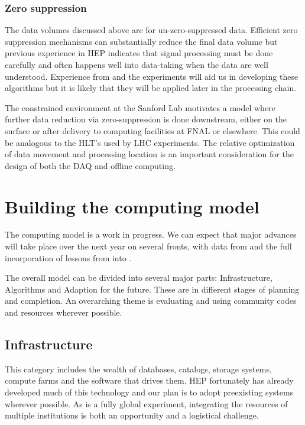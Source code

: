 \subsubsection{Zero suppression}

The data volumes discussed above are for un-zero-suppressed data.  Efficient zero suppression mechanisms can substantially reduce the final data volume but previous experience in HEP indicates that signal processing must be done carefully and often happens well into data-taking when the data are well understood.  Experience from   and the  experiments will aid us in developing these algorithms but it is likely that they will be applied later in the processing chain. 

The constrained environment at the Sanford Lab motivates a model where further data reduction via zero-suppression is done downstream, either on the surface or after delivery to computing facilities at FNAL or elsewhere. This could be analogous to the HLT's used by LHC experiments. The relative optimization of data movement and processing location is an important consideration for the design of both the DAQ and offline computing.





\section{Building the computing model}\label{sw:bld-cmp-mdl}

The   computing model is a work in progress.  We can expect that major advances will take place over the next year on several fronts, with data from  and the full incorporation of lessons from   into  . 


The overall model can be divided into several major parts:  Infrastructure, Algorithms and Adaption for the future.  These are in different stages of planning and completion.  An overarching theme is evaluating and using community codes and resources wherever possible. 



\subsection{Infrastructure}
This category includes the wealth of databases, catalogs, storage systems, compute farms and the software that drives them.  HEP fortunately has already developed much of this technology and our plan is to adopt preexisting systems wherever possible.  As   is a fully global experiment, integrating the resources of multiple institutions is both an opportunity and a logistical challenge.

